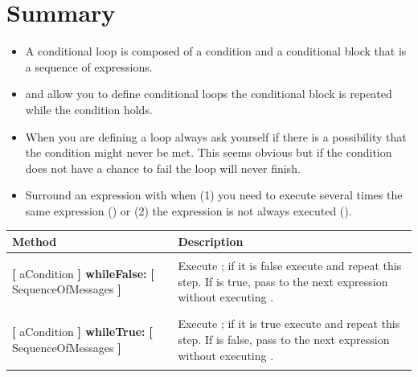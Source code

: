 \section{Summary}

\begin{itemize}
\item A conditional loop is composed of a condition and a conditional block that is a sequence of expressions.

\item {} and  allow you to define conditional loops \ie the conditional block is repeated while the condition holds. 

\item When you are defining a loop always ask yourself if there is a possibility that the condition might never be met. This seems obvious but if the condition does not have a chance to fail the loop will never finish.

\item Surround an expression with \ct{[ ]} when (1) you need to execute several times the same expression () or (2) the expression is not always executed ().

\end{itemize}


\begin{table}[h]
\small
\centering
\begin{tabular}{||p{5cm}|p{10cm}||} \hline
Method&Description\\ \hline
\begin{nalltt}
\textbf{[} aCondition \textbf{] whileFalse:}
  \textbf{[} SequenceOfMessages \textbf{]}
\end{nalltt}
&Execute \ct{aCondition};  if it is false execute \ct{SequenceOfMessages} and repeat this step.  If \ct{aCondition} is true, pass to the next expression without executing  \ct{SequenceOfMessages}. \\  \hline

\begin{nalltt}
\textbf{[} aCondition \textbf{] whileTrue:}
  \textbf{[} SequenceOfMessages \textbf{]}
\end{nalltt} 
&Execute \ct{aCondition};   if it is true execute \ct{SequenceOfMessages} and repeat this step.  If \ct{aCondition} is false, pass to the next expression without executing  \ct{SequenceOfMessages}. \\  \hline \hline
\end{tabular}
\end{table}




\ifx\wholebook\relax\else\fi





